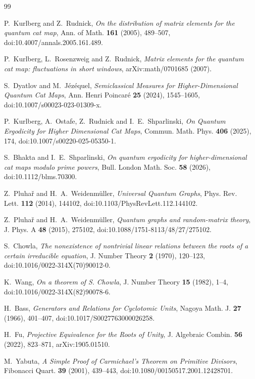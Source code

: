 \documentclass[11pt]{article}
\begin{document}
\begin{thebibliography}{99}

P.~Kurlberg and Z.~Rudnick,
\emph{On the distribution of matrix elements for the quantum cat map},
Ann. of Math. \textbf{161} (2005), 489--507,
doi:10.4007/annals.2005.161.489.

P.~Kurlberg, L.~Rosenzweig and Z.~Rudnick,
\emph{Matrix elements for the quantum cat map: fluctuations in short windows},
arXiv:math/0701685 (2007).

S.~Dyatlov and M.~J\'ez\'equel,
\emph{Semiclassical Measures for Higher-Dimensional Quantum Cat Maps},
Ann. Henri Poincar\'e \textbf{25} (2024), 1545--1605,
doi:10.1007/s00023-023-01309-x.

P.~Kurlberg, A.~Ostafe, Z.~Rudnick and I.~E.~Shparlinski,
\emph{On Quantum Ergodicity for Higher Dimensional Cat Maps},
Commun. Math. Phys. \textbf{406} (2025), 174,
doi:10.1007/s00220-025-05350-1.

S.~Bhakta and I.~E.~Shparlinski,
\emph{On quantum ergodicity for higher-dimensional cat maps modulo prime powers},
Bull. London Math. Soc. \textbf{58} (2026),
doi:10.1112/blms.70300.

Z.~Pluha\v r and H.~A.~Weidenm\"uller,
\emph{Universal Quantum Graphs},
Phys. Rev. Lett. \textbf{112} (2014), 144102,
doi:10.1103/PhysRevLett.112.144102.

Z.~Pluha\v r and H.~A.~Weidenm\"uller,
\emph{Quantum graphs and random-matrix theory},
J. Phys. A \textbf{48} (2015), 275102,
doi:10.1088/1751-8113/48/27/275102.

S.~Chowla,
\emph{The nonexistence of nontrivial linear relations between the roots of a certain irreducible equation},
J. Number Theory \textbf{2} (1970), 120--123,
doi:10.1016/0022-314X(70)90012-0.

K.~Wang,
\emph{On a theorem of S. Chowla},
J. Number Theory \textbf{15} (1982), 1--4,
doi:10.1016/0022-314X(82)90078-6.

H.~Bass,
\emph{Generators and Relations for Cyclotomic Units},
Nagoya Math. J. \textbf{27} (1966), 401--407,
doi:10.1017/S0027763000026258.

H.~Fu,
\emph{Projective Equivalence for the Roots of Unity},
J. Algebraic Combin. \textbf{56} (2022), 823--871,
arXiv:1905.01510.

M.~Yabuta,
\emph{A Simple Proof of Carmichael's Theorem on Primitive Divisors},
Fibonacci Quart. \textbf{39} (2001), 439--443,
doi:10.1080/00150517.2001.12428701.


\end{thebibliography}
\end{document}
